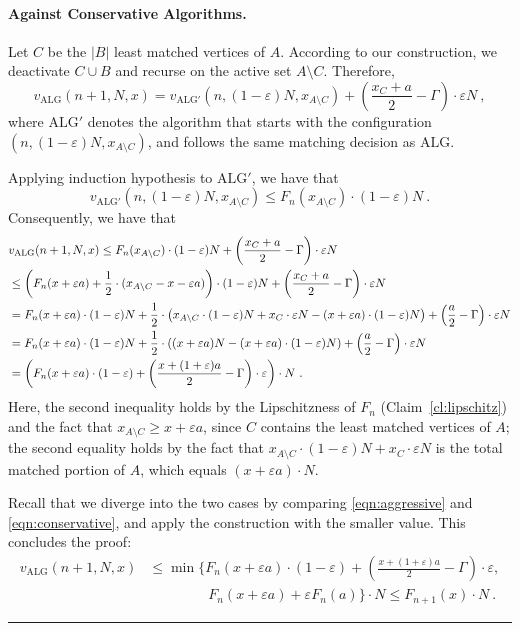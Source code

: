 \documentclass[11pt,letterpaper]{article}
\newenvironment{proof}{{\bf Proof:  }}{\hfill\rule{2mm}{2mm}\vspace*{5pt}}
\newcommand{\alg}{\mathrm{ALG}}
\newcommand{\eps}{\varepsilon}
\begin{document}
\begin{proof}
\paragraph{Against Conservative Algorithms.} Let $C$ be the $|B|$ least matched vertices of $A$. According to our construction, we deactivate $C\cup B$ and recurse on the active set $A\setminus C$. Therefore,
\[
v_\alg(n+1,N,x) = v_{\alg'}(n,(1-\eps)N,x_{A\setminus C}) + \left( \frac{x_C+a}{2} - \Gamma \right) \cdot \eps N~,
\]
where $\alg'$ denotes the algorithm that starts with the configuration $(n,(1-\eps)N,x_{A\setminus C})$, and follows the same matching decision as $\alg$. 

Applying induction hypothesis to $\alg'$, we have that
\[
v_{\alg'}(n,(1-\eps)N,x_{A\setminus C}) \le F_n(x_{A\setminus C}) \cdot (1-\eps)N~.
\]
Consequently, we have that
\begin{align}
& v_{\alg}(n+1,N,x) \le F_n(x_{A\setminus C}) \cdot (1-\eps)N + \left( \frac{x_C + a}{2} - \Gamma \right) \cdot \eps N \notag \\
& \le \left( F_n(x+\eps a) + \frac{1}{2} \cdot (x_{A\setminus C} - x - \eps a) \right) \cdot (1-\eps) N + \left( \frac{x_C + a}{2} - \Gamma \right) \cdot \eps N \notag \\
& = F_n(x+\eps a) \cdot (1-\eps)N + \frac{1}{2} \cdot \left( x_{A\setminus C} \cdot (1-\eps)N + x_C \cdot \eps N - (x+\eps a) \cdot (1-\eps) N \right) + \left(\frac{a}{2} - \Gamma \right) \cdot \eps N \notag \\
& = F_n(x+\eps a) \cdot (1-\eps)N + \frac{1}{2} \cdot \left( (x+\eps a)N - (x+\eps a) \cdot (1-\eps) N \right) + \left(\frac{a}{2} - \Gamma \right) \cdot \eps N \notag \\
& = \left( F_n(x+\eps a) \cdot (1-\eps) + \left( \frac{x+(1+\eps)a}{2} - \Gamma \right) \cdot \eps \right) \cdot N~.
\label{eqn:conservative}
\end{align}
Here, the second inequality holds by the Lipschitzness of $F_n$ (Claim~\ref{cl:lipschitz}) and the fact that $x_{A\setminus C} \ge x+\eps a$, since $C$ contains the least matched vertices of $A$; the second equality holds by the fact that $x_{A\setminus C} \cdot (1-\eps)N + x_C \cdot \eps N$ is the total matched portion of $A$, which equals $(x+\eps a)\cdot N$.

Recall that we diverge into the two cases by comparing \eqref{eqn:aggressive} and \eqref{eqn:conservative}, and apply the construction with the smaller value. This concludes the proof:  
\begin{align*}
v_\alg(n+1,N,x) & \le \min \bigg\{F_n(x+\eps a) \cdot (1-\eps) + \left(\frac{x+(1+\eps)a}{2} - \Gamma \right) \cdot \eps, \\
& \phantom{\le \min \bigg\{} \  F_n(x+\eps a) + \eps F_n(a) \bigg\} \cdot N\le F_{n+1}(x) \cdot N~.		
\end{align*}
\end{proof}
\end{document}
